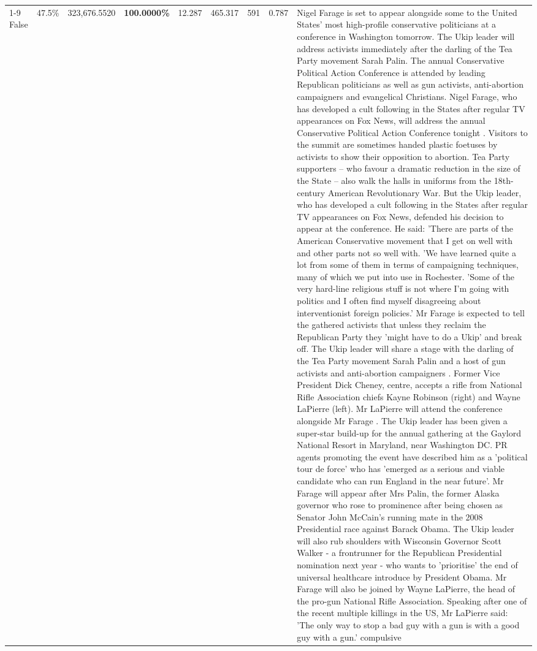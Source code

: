\begin{table}[H]
\begin{tabular}{lllrlllll}
\cline{1-9}
False & 47.5\% & 323,676.5520 & \bfseries \color{red} 100.0000\% & 12.287 & 465.317 & 591 & 0.787 & Nigel Farage is set to appear alongside some to the United States' most high-profile conservative politicians at a conference in Washington tomorrow. The Ukip leader will address activists immediately after the darling of the Tea Party movement Sarah Palin. The annual Conservative Political Action Conference is attended by leading Republican politicians as well as gun activists, anti-abortion campaigners and evangelical Christians. Nigel Farage, who has developed a cult following in the States after regular TV appearances on Fox News, will address the annual Conservative Political Action Conference tonight . Visitors to the summit are sometimes handed plastic foetuses by activists to show their opposition to abortion. Tea Party supporters – who favour a dramatic reduction in the size of the State – also walk the halls in uniforms from the 18th-century American Revolutionary War. But the Ukip leader, who has developed a cult following in the States after regular TV appearances on Fox News, defended his decision to appear at the conference. He said: 'There are parts of the American Conservative movement that I get on well with and other parts not so well with. 'We have learned quite a lot from some of them in terms of campaigning techniques, many of which we put into use in Rochester. 'Some of the very hard-line religious stuff is not where I'm going with politics and I often find myself disagreeing about interventionist foreign policies.' Mr Farage is expected to tell the gathered activists that unless they reclaim the Republican Party they 'might have to do a Ukip' and break off. The Ukip leader will share a stage with the darling of the Tea Party movement Sarah Palin and a host of gun activists and anti-abortion campaigners . Former Vice President Dick Cheney, centre, accepts a rifle from National Rifle Association chiefs Kayne Robinson (right) and Wayne LaPierre (left). Mr LaPierre will attend the conference alongside Mr Farage . The Ukip leader has been given a super-star build-up for the annual gathering at the Gaylord National Resort in Maryland, near Washington DC. PR agents promoting the event have described him as a 'political tour de force' who has 'emerged as a serious and viable candidate who can run England in the near future'. Mr Farage will appear after Mrs Palin, the former Alaska governor who rose to prominence after being chosen as Senator John McCain's running mate in the 2008 Presidential race against Barack Obama. The Ukip leader will also rub shoulders with Wisconsin Governor Scott Walker - a frontrunner for the Republican Presidential nomination next year - who wants to 'prioritise' the end of universal healthcare introduce by President Obama. Mr Farage will also be joined by Wayne LaPierre, the head of the pro-gun National Rifle Association. Speaking after one of the recent multiple killings in the US, Mr LaPierre said: 'The only way to stop a bad guy with a gun is with a good guy with a gun.' compulsive \\

\end{tabular}
\end{table}
